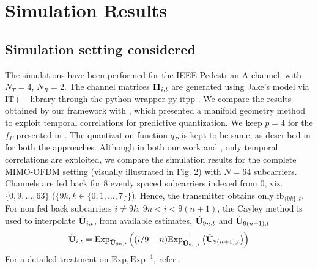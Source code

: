 \documentclass[conference]{IEEEtran}
\begin{document}
{%


\section{Simulation Results}
\label{section4}

\subsection{Simulation setting considered}
\label{setting}

\noindent The simulations have been performed for the IEEE Pedestrian-A channel, with $N_T=4$, $N_R=2$.  The channel matrices ${\bf H}_{i,t}$ are generated using Jake's model via IT++ library through the python wrapper py-itpp \cite{ViditPy}.
We compare the results obtained by our framework with \cite{6891198}, which presented a manifold geometry method to exploit temporal correlations for predictive quantization.
We keep $p=4$ for the $f_P$ presented in \cite{6891198}.
The quantization function $q_P$ is kept to be same, as described in \cite{6545375,6891198,Gupt1905:Predictive} for both the approaches.
Although in both our work and \cite{6891198}, only temporal correlations are exploited, we compare the simulation results for the complete MIMO-OFDM setting (visually illustrated in Fig. 2) with $N=64$ subcarriers. Channels are fed back for $8$ evenly spaced subcarriers indexed from 0, viz. $\{0,9,\ldots,63\}$ ($\{9k, k \in \{0,1,\ldots,7\}\}$). Hence, the transmitter obtains only $\text{fb}_{\{9k\},t}$.
For non fed back subcarriers $i\neq 9k$, $9n < i < 9(n+1)$, the Cayley method \cite{Gupt1905:Predictive} is used to interpolate $\tilde{{\bf U}}_{i,t}$, from available estimates, $\tilde{{\bf U}}_{9n,t}$ and $\tilde{{\bf U}}_{9(n+1), t}$
\begin{equation}
\label{eqn:cayley_i1_i2}
  \tilde{\bU}_{i,t} =  \text{Exp}_{\tilde{\bU}_{9n, t}}\left((i/9-n)\text{Exp}^{-1}_{\tilde{\bU}_{9n, t}}\left(\tilde{\bU}_{9(n+1),t}\right)\right)
\end{equation}
For a detailed treatment on $\text{Exp}, \text{Exp}^{-1}$, refer \cite{DBLP:journals/corr/abs-1708-00045}.

}
\end{document}
